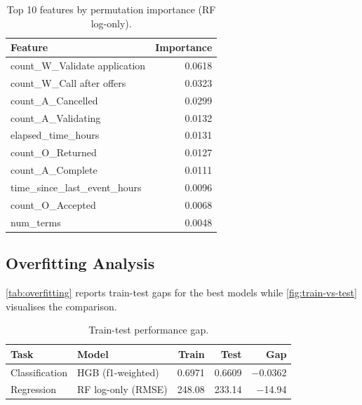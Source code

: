 \documentclass[runningheads]{llncs}
\begin{document}
\begin{table}[H]
    \centering
    \caption{Top 10 features by permutation importance (RF log-only).}
    \label{tab:regression-feature-importance}
    \begin{tabular}{lr}
        \toprule
        Feature & Importance \\
        \midrule
        count\_W\_Validate application      & 0.0618 \\
        count\_W\_Call after offers         & 0.0323 \\
        count\_A\_Cancelled                 & 0.0299 \\
        count\_A\_Validating                & 0.0132 \\
        elapsed\_time\_hours                & 0.0131 \\
        count\_O\_Returned                  & 0.0127 \\
        count\_A\_Complete                  & 0.0111 \\
        time\_since\_last\_event\_hours     & 0.0096 \\
        count\_O\_Accepted                  & 0.0068 \\
        num\_terms                          & 0.0048 \\
        \bottomrule
    \end{tabular}
\end{table}

\subsection{Overfitting Analysis}
\label{sec:overfitting}

\autoref{tab:overfitting} reports train-test gaps for the best models while
\autoref{fig:train-vs-test} visualises the comparison.

\begin{table}[H]
    \centering
    \caption{Train-test performance gap.}
    \label{tab:overfitting}
    \begin{tabular}{llrrr}
        \toprule
        Task & Model & Train & Test & Gap \\
        \midrule
        Classification & HGB (f1-weighted) & 0.6971 & 0.6609 & $-$0.0362 \\
        Regression     & RF log-only (RMSE) & 248.08 & 233.14 & $-$14.94 \\
        \bottomrule
    \end{tabular}
\end{table}
\end{document}
